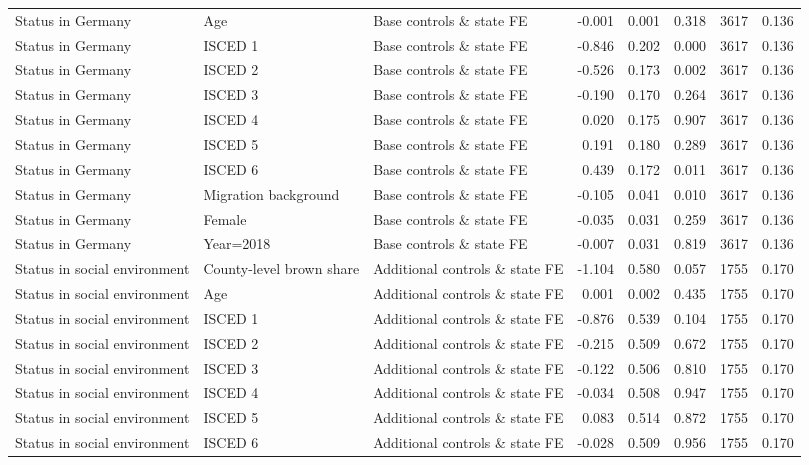 \begin{table}
{\begin{threeparttable}
\begin{tabular}[t]{lllrrrrr}
Status in Germany & Age & Base controls \& state FE & -0.001 & 0.001 & 0.318 & 3617 & 0.136\\
Status in Germany & ISCED 1 & Base controls \& state FE & -0.846 & 0.202 & 0.000 & 3617 & 0.136\\
Status in Germany & ISCED 2 & Base controls \& state FE & -0.526 & 0.173 & 0.002 & 3617 & 0.136\\
Status in Germany & ISCED 3 & Base controls \& state FE & -0.190 & 0.170 & 0.264 & 3617 & 0.136\\
Status in Germany & ISCED 4 & Base controls \& state FE & 0.020 & 0.175 & 0.907 & 3617 & 0.136\\
Status in Germany & ISCED 5 & Base controls \& state FE & 0.191 & 0.180 & 0.289 & 3617 & 0.136\\
Status in Germany & ISCED 6 & Base controls \& state FE & 0.439 & 0.172 & 0.011 & 3617 & 0.136\\
Status in Germany & Migration background & Base controls \& state FE & -0.105 & 0.041 & 0.010 & 3617 & 0.136\\
Status in Germany & Female & Base controls \& state FE & -0.035 & 0.031 & 0.259 & 3617 & 0.136\\
Status in Germany & Year=2018 & Base controls \& state FE & -0.007 & 0.031 & 0.819 & 3617 & 0.136\\
Status in social environment & County-level brown share & Additional controls \& state FE & -1.104 & 0.580 & 0.057 & 1755 & 0.170\\
Status in social environment & Age & Additional controls \& state FE & 0.001 & 0.002 & 0.435 & 1755 & 0.170\\
Status in social environment & ISCED 1 & Additional controls \& state FE & -0.876 & 0.539 & 0.104 & 1755 & 0.170\\
Status in social environment & ISCED 2 & Additional controls \& state FE & -0.215 & 0.509 & 0.672 & 1755 & 0.170\\
Status in social environment & ISCED 3 & Additional controls \& state FE & -0.122 & 0.506 & 0.810 & 1755 & 0.170\\
Status in social environment & ISCED 4 & Additional controls \& state FE & -0.034 & 0.508 & 0.947 & 1755 & 0.170\\
Status in social environment & ISCED 5 & Additional controls \& state FE & 0.083 & 0.514 & 0.872 & 1755 & 0.170\\
Status in social environment & ISCED 6 & Additional controls \& state FE & -0.028 & 0.509 & 0.956 & 1755 & 0.170\\

\end{tabular}
\end{threeparttable}}
\end{table}
